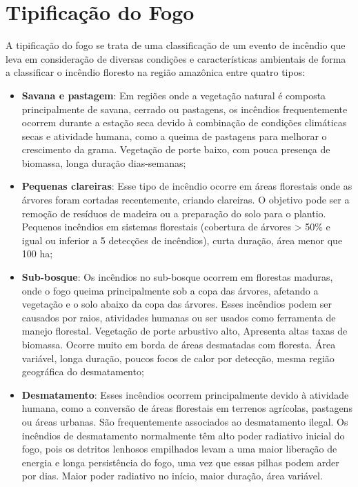 \section{Tipificação do Fogo}

A tipificação do fogo se trata de uma classificação de um evento de incêndio que leva em consideração de diversas condições e características ambientais de forma a classificar o incêndio floresto na região amazônica entre quatro tipos:

\begin{itemize}
    \item \textbf{Savana e pastagem}:  Em regiões onde a vegetação natural é composta principalmente de savana, cerrado ou pastagens, os incêndios frequentemente ocorrem durante a estação seca devido à combinação de condições climáticas secas e atividade humana, como a queima de pastagens para melhorar o crescimento da grama. Vegetação de porte baixo, com pouca presença de biomassa, longa duração dias-semanas;
    \item \textbf{Pequenas clareiras}: Esse tipo de incêndio ocorre em áreas florestais onde as árvores foram cortadas recentemente, criando clareiras. O objetivo pode ser a remoção de resíduos de madeira ou a preparação do solo para o plantio. Pequenos incêndios em sistemas florestais (cobertura de árvores > 50$\%$ e igual ou inferior a 5 detecções de incêndios), curta duração, área menor que 100 ha;
    \item \textbf{Sub-bosque}: Os incêndios no sub-bosque ocorrem em florestas maduras, onde o fogo queima principalmente sob a copa das árvores, afetando a vegetação e o solo abaixo da copa das árvores. Esses incêndios podem ser causados por raios, atividades humanas ou ser usados como ferramenta de manejo florestal. Vegetação de porte arbustivo alto, Apresenta altas taxas de biomassa. Ocorre muito em borda de áreas desmatadas com floresta. Área variável, longa duração, poucos focos de calor por detecção, mesma região geográfica do desmatamento;
    \item \textbf{Desmatamento}: Esses incêndios ocorrem principalmente devido à atividade humana, como a conversão de áreas florestais em terrenos agrícolas, pastagens ou áreas urbanas. São frequentemente associados ao desmatamento ilegal. Os incêndios de desmatamento normalmente têm alto poder radiativo inicial do fogo, pois os detritos lenhosos empilhados levam a uma maior liberação de energia e longa persistência do fogo, uma vez que essas pilhas podem arder por dias. Maior poder radiativo no início, maior duração, área variável.

\end{itemize} 

